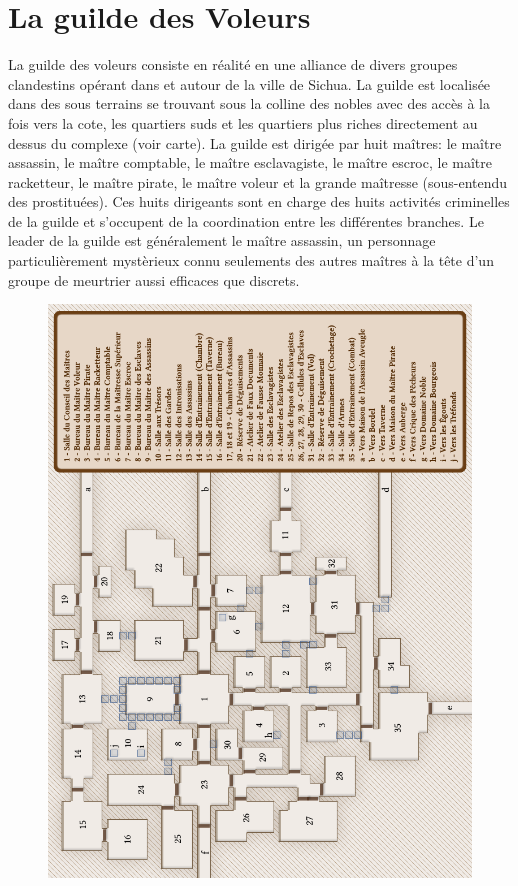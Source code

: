\section{La guilde des Voleurs}

La guilde des voleurs consiste en réalité en une alliance de divers groupes 
clandestins opérant dans et autour de la ville de Sichua. La guilde est 
localisée dans des sous terrains se trouvant sous la colline des nobles
avec des accès à la fois vers la cote, les quartiers suds et les quartiers 
plus riches directement au dessus du complexe (voir carte). La guilde est
dirigée par huit maîtres: le maître assassin, le maître comptable, le maître 
esclavagiste, le maître escroc, le maître racketteur, le maître pirate, le 
maître voleur et la grande maîtresse (sous-entendu des prostituées). Ces huits 
dirigeants sont en charge des huits activités criminelles de la guilde et
s'occupent de la coordination entre les différentes branches. Le leader
de la guilde est généralement le maître assassin, un personnage 
particulièrement mystèrieux connu seulements des autres maîtres à la
tête d'un groupe de meurtrier aussi efficaces que discrets.


\begin{figure}[p]
\includegraphics[width=16cm]{Maps/GuildeVoleurs.png}
\end{figure}

